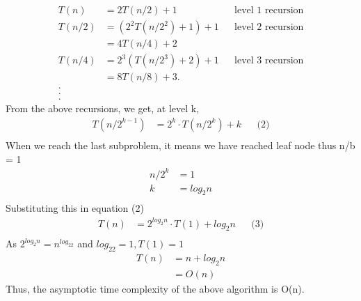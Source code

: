 \documentclass[12pt]{article}
\begin{document}
\begin{itemize}
    \begin{align*}
        T(n) &= 2T(n/2) + 1 && \text{level 1 recursion}\\
       T(n/2) &= (2^{2}T(n/2^{2}) + 1) + 1 && \text{level 2 recursion}\\
       &= 4T(n/4) + 2 \\
       T(n/4) &= 2^3(T(n/2^{3}) + 2) + 1 && \text{level 3 recursion}\\
       &= 8T(n/8) + 3
       .\\
       .\\
       .\\
       .
   \end{align*}
    From the above recursions, we  get, at level k,
       \begin{align*}
       T(n/2^{k-1}) &= 2^k\cdot T(n/2^k) + k && \text{(2)}\\ 
       \end{align*}
       When we reach the last subproblem, it means we have reached leaf node thus n/b = 1
       \begin{align*}
           n/2^k &= 1\\
           k &= log_2n\\
       \end{align*}
       Substituting this in equation (2)
       \begin{align*}
           T(n) &= 2^{log_2n}\cdot T(1) + log_2n && \text{(3)}\\ 
       \end{align*}
       As $2^{log_2n} = n^{log_22}$ and $log_22 = 1, T(1) = 1$
       \begin{align*}
           T(n) &= n + log_2n\\
           &= O(n)
       \end{align*}
    Thus, the asymptotic time complexity of the above algorithm is O(n).
\end{itemize}
\end{document}
